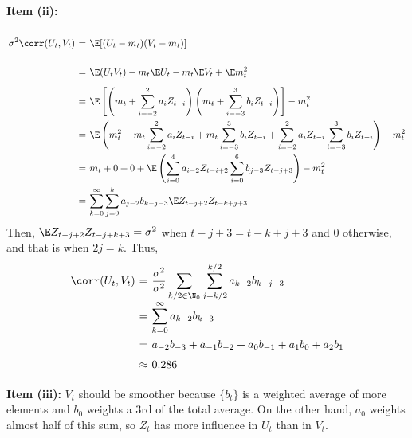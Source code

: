 \textbf{Item (ii):}
\[ \everymath{\displaystyle}
\arraycolsep=1.8pt\def\arraystretch{2.5}
\begin{array}{rcl}
    \sigma^2 \corr(U_t,V_t) & = & \E[(U_t-m_t)(V_t - m_t)]\\
    & = & \E(U_t V_t) - m_t\E U_t - m_t\E V_t + \E m_t^2\\
    & = & \E \left[ \left( m_t + \sum_{i = -2}^2 a_i Z_{t-i} \right) \left( m_t + \sum_{i = -3}^3 b_i Z_{t-i} \right) \right] - m_t^2\\
    & = & \E\left( m_t^2 + m_t \sum_{i = -2}^2 a_i Z_{t-i} + m_t \sum_{i = -3}^3 b_i Z_{t-i} + \sum_{i = -2}^2 a_i Z_{t-i} \sum_{i = -3}^3 b_i Z_{t-i} \right) - m_t^2\\
    & = & m_t + 0 + 0 + \E\left( \sum_{i = 0}^4 a_{i-2} Z_{t-i+2} \sum_{i = 0}^6 b_{j-3} Z_{t-j+3} \right) - m_t^2\\
    & = &  \sum_{k = 0}^{\infty} \sum_{j = 0}^k a_{j-2} b_{k-j-3} \E Z_{t-j+2} Z_{t-k+j+3}
\end{array}\]
Then, $\E Z_{t-j+2} Z_{t-j+k+3} = \sigma^2$ when $t-j+3 = t-k+j+3$ and 0 otherwise, and that is when $2j = k$. Thus,
\[ \everymath{\displaystyle}
\arraycolsep=1.8pt\def\arraystretch{1.5}
\begin{array}{rcl}
    \corr(U_t,V_t) & = & \frac{\sigma^2}{\sigma^2} \sum_{k/2 \in \N_0} \sum_{j = k/2}^{k/2} a_{k-2} b_{k-j-3} \\
    & = & \sum_{k = 0}^{\infty} a_{k-2} b_{k-3}\\
    & = & a_{-2}b_{-3} + a_{-1}b_{-2} + a_{0}b_{-1} + a_{1}b_{0} + a_{2}b_{1}\\
    & \approx & 0.286
\end{array} \]

\textbf{Item (iii):} $V_t$ should be smoother because $\{b_t\}$ is a weighted average of more elements and $b_0$ weights a 3rd of the total average. On the other hand, $a_0$ weights almost half of this sum, so $Z_t$ has more influence in $U_t$ than in $V_t$.